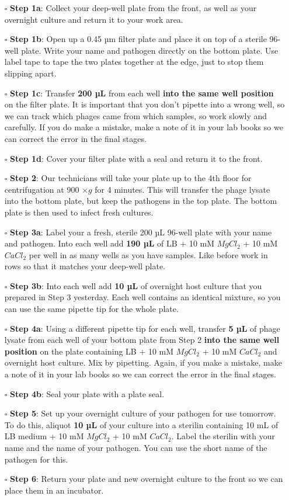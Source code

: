 \documentclass[
]{book}
\providecommand{\tightlist}{%
  \setlength{\itemsep}{0pt}\setlength{\parskip}{0pt}}
\begin{document}
\begin{itemize}
\tightlist
\item[$\square$]
  \textbf{Step 1a}: Collect your deep-well plate from the front, as well as your overnight culture and return it to your work area.
\item[$\square$]
  \textbf{Step 1b}: Open up a 0.45 µm filter plate and place it on top of a sterile 96-well plate. Write your name and pathogen directly on the bottom plate. Use label tape to tape the two plates together at the edge, just to stop them slipping apart.
\item[$\square$]
  \textbf{Step 1c}: Transfer \textbf{200 µL} from each well \textbf{into the same well position} on the filter plate. It is important that you don't pipette into a wrong well, so we can track which phages came from which samples, so work slowly and carefully. If you do make a mistake, make a note of it in your lab books so we can correct the error in the final stages.
\item[$\square$]
  \textbf{Step 1d}: Cover your filter plate with a seal and return it to the front.
\item[$\square$]
  \textbf{Step 2}: Our technicians will take your plate up to the 4th floor for centrifugation at 900 \(\times g\) for 4 minutes. This will transfer the phage lysate into the bottom plate, but keep the pathogens in the top plate. The bottom plate is then used to infect fresh cultures.
\item[$\square$]
  \textbf{Step 3a}: Label your a fresh, sterile 200 µL 96-well plate with your name and pathogen. Into each well add \textbf{190 µL} of LB + 10 mM \(MgCl_{2}\) + 10 mM \(CaCl_{2}\) per well in as many wells as you have samples. Like before work in rows so that it matches your deep-well plate.
\item[$\square$]
  \textbf{Step 3b}: Into each well add \textbf{10 µL} of overnight host culture that you prepared in Step 3 yesterday. Each well contains an identical mixture, so you can use the same pipette tip for the whole plate.
\item[$\square$]
  \textbf{Step 4a}: Using a different pipette tip for each well, transfer \textbf{5 µL} of phage lysate from each well of your bottom plate from Step 2 \textbf{into the same well position} on the plate containing LB + 10 mM \(MgCl_{2}\) + 10 mM \(CaCl_{2}\) and overnight host culture. Mix by pipetting. Again, if you make a mistake, make a note of it in your lab books so we can correct the error in the final stages.
\item[$\square$]
  \textbf{Step 4b}: Seal your plate with a plate seal.
\item[$\square$]
  \textbf{Step 5}: Set up your overnight culture of your pathogen for use tomorrow. To do this, aliquot \textbf{10 µL} of your culture into a sterilin containing 10 mL of LB medium + 10 mM \(MgCl_{2}\) + 10 mM \(CaCl_{2}\). Label the sterilin with your name and the name of your pathogen. You can use the short name of the pathogen for this.
\item[$\square$]
  \textbf{Step 6}: Return your plate and new overnight culture to the front so we can place them in an incubator.
\end{itemize}
\end{document}
